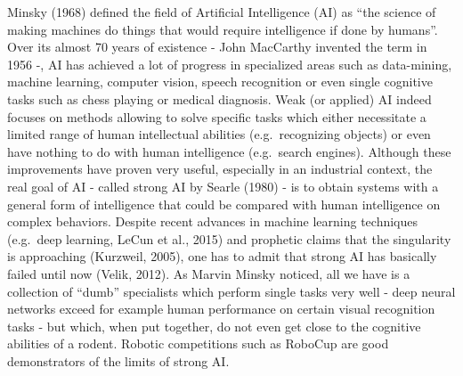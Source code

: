 \documentclass[
  11pt,
  a4paper,
]{scrbook}
\begin{document}
Minsky (1968) defined the field of Artificial Intelligence (AI) as ``the
science of making machines do things that would require intelligence if
done by humans''. Over its almost 70 years of existence - John MacCarthy
invented the term in 1956 -, AI has achieved a lot of progress in
specialized areas such as data-mining, machine learning, computer
vision, speech recognition or even single cognitive tasks such as chess
playing or medical diagnosis. Weak (or applied) AI indeed focuses on
methods allowing to solve specific tasks which either necessitate a
limited range of human intellectual abilities (e.g.~recognizing objects)
or even have nothing to do with human intelligence (e.g.~search
engines). Although these improvements have proven very useful,
especially in an industrial context, the real goal of AI - called strong
AI by Searle (1980) - is to obtain systems with a general form of
intelligence that could be compared with human intelligence on complex
behaviors. Despite recent advances in machine learning techniques
(e.g.~deep learning, LeCun et al., 2015) and prophetic claims that the
singularity is approaching (Kurzweil, 2005), one has to admit that
strong AI has basically failed until now (Velik, 2012). As Marvin Minsky
noticed, all we have is a collection of ``dumb'' specialists which
perform single tasks very well - deep neural networks exceed for example
human performance on certain visual recognition tasks - but which, when
put together, do not even get close to the cognitive abilities of a
rodent. Robotic competitions such as RoboCup are good demonstrators of
the limits of strong AI.
\end{document}
